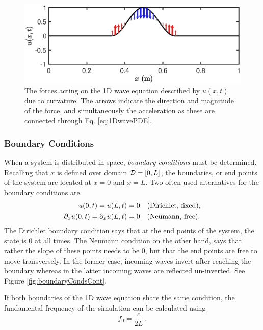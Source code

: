 \begin{figure}[h]
    \centering
    \includegraphics[width=\textwidth]{figures/fdtd/curvature.eps}
    \caption{\label{fig:curvature} The forces acting on the 1D wave equation described by $u(x,t)$ due to curvature. The arrows indicate the direction and magnitude of the force, and simultaneously the acceleration as these are connected through Eq. \eqref{eq:1DwavePDE}.}
\end{figure}

\subsubsection{Boundary Conditions}
When a system is distributed in space, \textit{boundary conditions} must be determined. Recalling that $x$ is defined over domain $\mathcal{D} = [0, L]$, the boundaries, or end points of the system are located at $x=0$ and $x=L$. Two often-used alternatives for the boundary conditions are
%
\begin{subequations}\label{eq:boundaryCond1DWave}
    \begin{align}
        u(0, t) = u(L, t) &= 0\quad \text{(Dirichlet, fixed)},\label{eq:contDirichlet}\\
        \partial_x u(0, t) = \partial_x u(L, t) &= 0\quad \text{(Neumann, free)}.\label{eq:contNeumann}
    \end{align}
\end{subequations}
%
The Dirichlet boundary condition says that at the end points of the system, the state is 0 at all times. The Neumann condition on the other hand, says that rather the slope of these points needs to be 0, but that the end points are free to move transversely. In the former case, incoming waves invert after reaching the boundary whereas in the latter incoming waves are reflected un-inverted. See Figure \ref{fig:boundaryCondsCont}.

If both boundaries of the 1D wave equation share the same condition, the fundamental frequency of the simulation can be calculated using 
\begin{equation}\label{eq:fundamentalFreq}
    f_0 = \frac{c}{2L}\ .
\end{equation}

